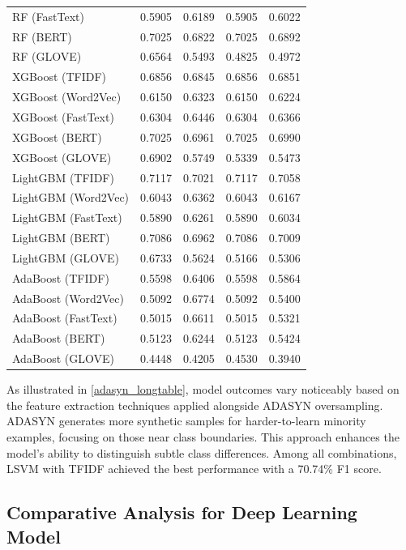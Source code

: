 \begin{longtable}{p{.40\linewidth} p{.11\linewidth}p{.11\linewidth}p{.11\linewidth}p{.11\linewidth}}
RF (FastText) & 0.5905 & 0.6189 & 0.5905 & 0.6022 \\
RF (BERT) & 0.7025 & 0.6822 & 0.7025 & 0.6892 \\
RF (GLOVE) & 0.6564 & 0.5493 & 0.4825 & 0.4972 \\
XGBoost (TFIDF) & 0.6856 & 0.6845 & 0.6856 & 0.6851 \\
XGBoost (Word2Vec) & 0.6150 & 0.6323 & 0.6150 & 0.6224 \\
XGBoost (FastText) & 0.6304 & 0.6446 & 0.6304 & 0.6366 \\
XGBoost (BERT) & 0.7025 & 0.6961 & 0.7025 & 0.6990 \\
XGBoost (GLOVE) & 0.6902 & 0.5749 & 0.5339 & 0.5473 \\
LightGBM (TFIDF) & 0.7117 & 0.7021 & 0.7117 & 0.7058 \\
LightGBM (Word2Vec) & 0.6043 & 0.6362 & 0.6043 & 0.6167 \\
LightGBM (FastText) & 0.5890 & 0.6261 & 0.5890 & 0.6034 \\
LightGBM (BERT) & 0.7086 & 0.6962 & 0.7086 & 0.7009 \\
LightGBM (GLOVE) & 0.6733 & 0.5624 & 0.5166 & 0.5306 \\
AdaBoost (TFIDF) & 0.5598 & 0.6406 & 0.5598 & 0.5864 \\
AdaBoost (Word2Vec) & 0.5092 & 0.6774 & 0.5092 & 0.5400 \\
AdaBoost (FastText) & 0.5015 & 0.6611 & 0.5015 & 0.5321 \\
AdaBoost (BERT) & 0.5123 & 0.6244 & 0.5123 & 0.5424 \\
AdaBoost (GLOVE) & 0.4448 & 0.4205 & 0.4530 & 0.3940 \\
\end{longtable}

\vspace{-\baselineskip}
\vspace{0.8em}
\noindent
As illustrated in \autoref{adasyn_longtable}, model outcomes vary noticeably based on the feature extraction techniques applied alongside ADASYN oversampling. ADASYN generates more synthetic samples for harder-to-learn minority examples, focusing on those near class boundaries. This approach enhances the model's ability to distinguish subtle class differences. Among all combinations, LSVM with TFIDF achieved the best performance with a 70.74\% F1 score.


\subsection{Comparative Analysis for Deep Learning Model}

